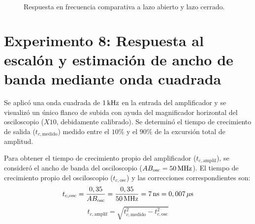\begin{figure}[!ht]
    \caption{Respuesta en frecuencia comparativa a lazo abierto y lazo cerrado.}
    \label{fig:respuesta_frecuencia_comparativa}
\end{figure}

\section{Experimento 8: Respuesta al escalón y estimación de ancho de banda mediante onda cuadrada}
Se aplicó una onda cuadrada de $1\,\mathrm{kHz}$ en la entrada del amplificador y se visualizó un único flanco de subida con ayuda del magnificador horizontal del osciloscopio ($X10$, debidamente calibrado). Se determinó el tiempo de crecimiento de salida ($t_{c,\text{medido}}$) medido entre el $10\%$ y el $90\%$ de la excursión total de amplitud.

Para obtener el tiempo de crecimiento propio del amplificador ($t_{c,\text{amplif}}$), se consideró el ancho de banda del osciloscopio ($AB_{\text{osc}} = 50\,\mathrm{MHz}$). El tiempo de crecimiento propio del osciloscopio ($t_{c,\text{osc}}$) y las correcciones correspondientes son:
\begin{equation}
    t_{c,\text{osc}} = \frac{0,35}{AB_{\text{osc}}} = \frac{0,35}{50\,\mathrm{MHz}} = 7\,\mathrm{ns} = 0,007\,\mathrm{\mu s}
\end{equation}
\begin{equation}
    t_{c,\text{amplif}} = \sqrt{t_{c,\text{medido}}^2 - t_{c,\text{osc}}^2}
\end{equation}

